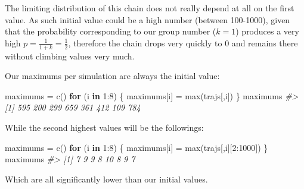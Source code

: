 \documentclass[
]{article}
\newenvironment{Shaded}{\begin{snugshade}}{\end{snugshade}}
\newcommand{\CommentTok}[1]{\textcolor[rgb]{0.56,0.35,0.01}{\textit{#1}}}
\newcommand{\ControlFlowTok}[1]{\textcolor[rgb]{0.13,0.29,0.53}{\textbf{#1}}}
\newcommand{\DecValTok}[1]{\textcolor[rgb]{0.00,0.00,0.81}{#1}}
\newcommand{\FunctionTok}[1]{\textcolor[rgb]{0.00,0.00,0.00}{#1}}
\newcommand{\NormalTok}[1]{#1}
\newcommand{\OtherTok}[1]{\textcolor[rgb]{0.56,0.35,0.01}{#1}}
\newcommand{\SpecialCharTok}[1]{\textcolor[rgb]{0.00,0.00,0.00}{#1}}
\begin{document}
The limiting distribution of this chain does not really depend at all on
the first value. As such initial value could be a high number (between
100-1000), given that the probability corresponding to our group number
(\(k=1\)) produces a very high \(p=\frac{1}{1+k} = \frac{1}{2}\),
therefore the chain drops very quickly to 0 and remains there without
climbing values very much.

Our maximums per simulation are always the initial value:

\begin{Shaded}
\begin{Highlighting}[]
\NormalTok{maximums }\OtherTok{=} \FunctionTok{c}\NormalTok{()}
\ControlFlowTok{for}\NormalTok{ (i }\ControlFlowTok{in} \DecValTok{1}\SpecialCharTok{:}\DecValTok{8}\NormalTok{) \{}
\NormalTok{    maximums[i] }\OtherTok{=} \FunctionTok{max}\NormalTok{(trajs[,i])}
\NormalTok{\}}
\NormalTok{maximums}
\CommentTok{\#\textgreater{} [1] 595 200 299 659 361 412 109 784}
\end{Highlighting}
\end{Shaded}

While the second highest values will be the followings:

\begin{Shaded}
\begin{Highlighting}[]
\NormalTok{maximums }\OtherTok{=} \FunctionTok{c}\NormalTok{()}
\ControlFlowTok{for}\NormalTok{ (i }\ControlFlowTok{in} \DecValTok{1}\SpecialCharTok{:}\DecValTok{8}\NormalTok{) \{}
\NormalTok{    maximums[i] }\OtherTok{=} \FunctionTok{max}\NormalTok{(trajs[,i][}\DecValTok{2}\SpecialCharTok{:}\DecValTok{1000}\NormalTok{])}
\NormalTok{\}}
\NormalTok{maximums}
\CommentTok{\#\textgreater{} [1]  7  9  9  8 10  8  9  7}
\end{Highlighting}
\end{Shaded}

Which are all significantly lower than our initial values.
\end{document}
